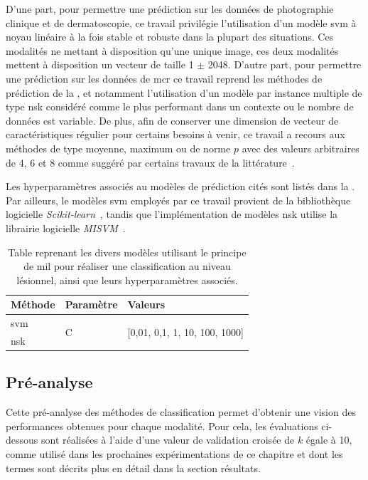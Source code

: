 D'une part, pour permettre une prédiction sur les données de photographie clinique et de dermatoscopie, ce travail privilégie l'utilisation d'un modèle \gls{svm} à noyau linéaire à la fois stable et robuste dans la plupart des situations. Ces modalités ne mettant à disposition qu’une unique image, ces deux modalités mettent à disposition un vecteur de taille 1 $\pm$ 2048. D'autre part, pour permettre une prédiction sur les données de \gls{mcr} ce travail reprend les méthodes de prédiction de la , et notamment l'utilisation d'un modèle par instance multiple de type \gls{nsk} considéré comme le plus performant dans un contexte ou le nombre de données est variable. De plus, afin de conserver une dimension de vecteur de caractéristiques régulier pour certains besoins à venir, ce travail a recours aux méthodes de type moyenne, maximum ou de norme $p$ avec des valeurs arbitraires de 4, 6 et 8 comme suggéré par certains travaux de la littérature~\cite{Li2016,Xu2017}.\par

Les hyperparamètres associés au modèles de prédiction cités sont listés dans la . Par ailleurs, le modèles \gls{svm} employés par ce travail provient de la bibliothèque logicielle \textit{Scikit-learn}~\cite{pedregosa2011}, tandis que l'implémentation de modèles \gls{nsk} utilise la librairie logicielle \textit{MISVM}~\cite{Doran2013}.\par
\begin{table}[H]
    \centering
    \begin{tabular}{lll}
    \toprule
    \textbf{Méthode}    & \textbf{Paramètre}& \textbf{Valeurs}                                  \\ \midrule
    \gls{svm}           & \multirow{2}{*}{C}& \multirow{2}{*}{[0,01, 0,1, 1, 10, 100, 1000]}    \\ \cline{1-1}
    \gls{nsk}           &                   &                                                   \\ \bottomrule 
    \end{tabular}    
    \caption{Table reprenant les divers modèles utilisant le principe de \gls{mil} pour réaliser une classification au niveau lésionnel, ainsi que leurs hyperparamètres associés.}
    \label{tab:multimodal_models_parameters}
\end{table}\par
\clearpage

\subsection{Pré-analyse}
Cette pré-analyse des méthodes de classification permet d'obtenir une vision des performances obtenues pour chaque modalité. Pour cela, les évaluations ci-dessous sont réalisées à l'aide d'une valeur de validation croisée de $k$ égale à 10, comme utilisé dans les prochaines expérimentations de ce chapitre et dont les termes sont décrits plus en détail dans la section résultats.\par

